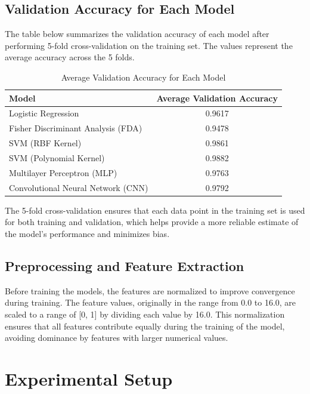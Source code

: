 \documentclass{article}
\begin{document}
\subsection{Validation Accuracy for Each Model}
The table below summarizes the validation accuracy of each model after performing 5-fold cross-validation on the training set. The values represent the average accuracy across the 5 folds.

\begin{table}[h]
    \centering
    \caption{Average Validation Accuracy for Each Model}
    \label{tab:validation_accuracy}
    \begin{tabular}{l c}
        \toprule
        \textbf{Model} & \textbf{Average Validation Accuracy} \\
        \midrule
        Logistic Regression & 0.9617 \\
        Fisher Discriminant Analysis (FDA) & 0.9478 \\
        SVM (RBF Kernel) & 0.9861 \\
        SVM (Polynomial Kernel) & 0.9882 \\
        Multilayer Perceptron (MLP) & 0.9763 \\
        Convolutional Neural Network (CNN) & 0.9792 \\
        \bottomrule
    \end{tabular}
\end{table}

The 5-fold cross-validation ensures that each data point in the training set is used for both training and validation, which helps provide a more reliable estimate of the model's performance and minimizes bias.

\subsection{Preprocessing and Feature Extraction}
Before training the models, the features are normalized to improve convergence during training. The feature values, originally in the range from 0.0 to 16.0, are scaled to a range of [0, 1] by dividing each value by 16.0. This normalization ensures that all features contribute equally during the training of the model, avoiding dominance by features with larger numerical values.

\section{Experimental Setup}
\end{document}
